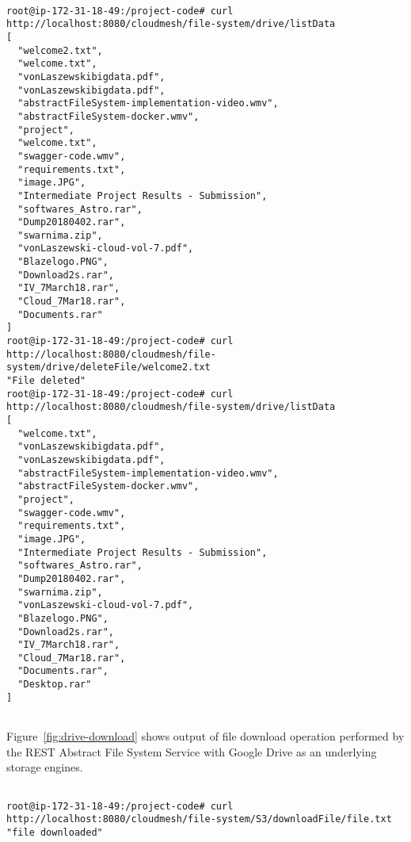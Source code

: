 \begin{figure*}[!ht]
\begin{footnotesize}
\begin{verbatim}

root@ip-172-31-18-49:/project-code# curl 
http://localhost:8080/cloudmesh/file-system/drive/listData
[
  "welcome2.txt",
  "welcome.txt",
  "vonLaszewskibigdata.pdf",
  "vonLaszewskibigdata.pdf",
  "abstractFileSystem-implementation-video.wmv",
  "abstractFileSystem-docker.wmv",
  "project",
  "welcome.txt",
  "swagger-code.wmv",
  "requirements.txt",
  "image.JPG",
  "Intermediate Project Results - Submission",
  "softwares_Astro.rar",
  "Dump20180402.rar",
  "swarnima.zip",
  "vonLaszewski-cloud-vol-7.pdf",
  "Blazelogo.PNG",
  "Download2s.rar",
  "IV_7March18.rar",
  "Cloud_7Mar18.rar",
  "Documents.rar"
]
root@ip-172-31-18-49:/project-code# curl 
http://localhost:8080/cloudmesh/file-system/drive/deleteFile/welcome2.txt
"File deleted"
root@ip-172-31-18-49:/project-code# curl 
http://localhost:8080/cloudmesh/file-system/drive/listData
[
  "welcome.txt",
  "vonLaszewskibigdata.pdf",
  "vonLaszewskibigdata.pdf",
  "abstractFileSystem-implementation-video.wmv",
  "abstractFileSystem-docker.wmv",
  "project",
  "swagger-code.wmv",
  "requirements.txt",
  "image.JPG",
  "Intermediate Project Results - Submission",
  "softwares_Astro.rar",
  "Dump20180402.rar",
  "swarnima.zip",
  "vonLaszewski-cloud-vol-7.pdf",
  "Blazelogo.PNG",
  "Download2s.rar",
  "IV_7March18.rar",
  "Cloud_7Mar18.rar",
  "Documents.rar",
  "Desktop.rar"
]


\end{verbatim}
\end{footnotesize}
\caption{Drive delete operations}\label{fig:drive-delete}
\end{figure*}


Figure~\ref{fig:drive-download} shows output of file download
operation performed by the REST Abstract File System Service with
Google Drive as an underlying storage engines.

\begin{figure*}[!ht]
\begin{footnotesize}
\begin{verbatim}

root@ip-172-31-18-49:/project-code# curl 
http://localhost:8080/cloudmesh/file-system/S3/downloadFile/file.txt
"file downloaded"

\end{verbatim}
\end{footnotesize}
\caption{Drive download operations}\label{fig:drive-download}
\end{figure*}



